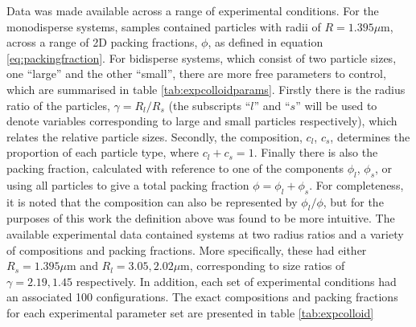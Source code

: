 Data was made available across a range of experimental conditions.
For the monodisperse systems, samples contained particles with radii of $R=1.395\mu$m, across a range of 2D packing fractions, $\phi$, as defined in equation \eqref{eq:packingfraction}.
For bidisperse systems, which consist of two particle sizes, one ``large'' and the other ``small'', there are more free parameters to control, which are summarised in table \ref{tab:expcolloidparams}.
Firstly there is the radius ratio of the particles, $\gamma=R_l/R_s$ (the subscripts ``$l$'' and ``$s$'' will be used to denote variables corresponding to large and small particles respectively), which relates the relative particle sizes.
Secondly, the composition, $c_l$, $c_s$, determines the proportion of each particle type, where $c_l+c_s=1$.
Finally there is also the packing fraction, calculated with reference to one of the components $\phi_l$, $\phi_s$, or using all particles to give a total packing fraction $\phi=\phi_l+\phi_s$.
For completeness, it is noted that the composition can also be represented by $\phi_l/\phi$, but for the purposes of this work the definition above was found to be more intuitive.
The available experimental data contained systems at two radius ratios and a variety of compositions and packing fractions.
More specifically, these had either $R_s=1.395\mu$m and $R_l=3.05,2.02\mu$m, corresponding to size ratios of $\gamma=2.19, 1.45$ respectively.
In addition, each set of experimental conditions had an associated 100 configurations. 
The exact compositions and packing fractions for each experimental parameter set are presented in table \ref{tab:expcolloid}

